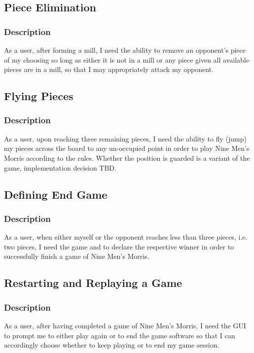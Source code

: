 \documentclass[11pt]{article}
\begin{document}
\subsection{Piece Elimination}
\label{sec:orga001de4}
\subsubsection*{Description}
\label{sec:orgf84cd38}
As a user, after forming a mill, I need the ability to remove an opponent's piece of my choosing
so long as either it is not in a mill or any piece given all available pieces are in a mill, so
that I may appropriately attack my opponent.
\subsection{Flying Pieces}
\label{sec:org6817def}
\subsubsection*{Description}
\label{sec:orgfbf4acf}
As a user, upon reaching three remaining pieces, I need the ability to fly (jump) my pieces
across the board to any un-occupied point in order to play Nine Men's Morris according to the
rules. Whether the position is guarded is a variant of the game, implementation decision TBD.
\subsection{Defining End Game}
\label{sec:org25e89ad}
\subsubsection*{Description}
\label{sec:org4e1de6e}
As a user, when either myself or the opponent reaches less than three pieces, i.e. two pieces, I
need the game and to declare the respective winner in order to successfully finish a game of
Nine Men's Morris.
\subsection{Restarting and Replaying a Game}
\label{sec:orgd356751}
\subsubsection*{Description}
\label{sec:orgf2da15a}
As a user, after having completed a game of Nine Men's Morris, I need the GUI to prompt me to
either play again or to end the game software so that I can accordingly choose whether to keep
playing or to end my game session.
\end{document}
